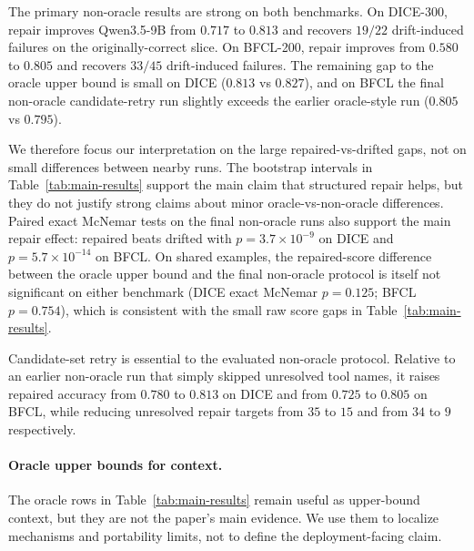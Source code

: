 \documentclass{llncs}
\begin{document}
The primary non-oracle results are strong on both benchmarks. On DICE-300, repair
improves Qwen3.5-9B from $0.717$ to $0.813$ and recovers $19/22$ drift-induced
failures on the originally-correct slice. On BFCL-200, repair improves from $0.580$
to $0.805$ and recovers $33/45$ drift-induced failures. The remaining gap to the
oracle upper bound is small on DICE ($0.813$ vs $0.827$), and on BFCL the final
non-oracle candidate-retry run slightly exceeds the earlier oracle-style run
($0.805$ vs $0.795$).

We therefore focus our interpretation on the large repaired-vs-drifted gaps, not on
small differences between nearby runs. The bootstrap intervals in
Table~\ref{tab:main-results} support the main claim that structured repair helps,
but they do not justify strong claims about minor oracle-vs-non-oracle differences.
Paired exact McNemar tests on the final non-oracle runs also support the main
repair effect: repaired beats drifted with $p=3.7\times 10^{-9}$ on DICE and
$p=5.7\times 10^{-14}$ on BFCL\@. On shared examples, the repaired-score difference
between the oracle upper bound and the final non-oracle protocol is itself not
significant on either benchmark (DICE exact McNemar $p=0.125$; BFCL
$p=0.754$), which is consistent with the small raw score gaps in
Table~\ref{tab:main-results}.

Candidate-set retry is essential to the evaluated non-oracle protocol. Relative to
an earlier non-oracle run that simply skipped unresolved tool names, it raises
repaired accuracy from $0.780$ to $0.813$ on DICE and from $0.725$ to $0.805$ on
BFCL, while reducing unresolved repair targets from $35$ to $15$ and from $34$ to
$9$ respectively.

\paragraph{Oracle upper bounds for context.}
The oracle rows in Table~\ref{tab:main-results} remain useful as upper-bound
context, but they are not the paper's main evidence. We use them to localize
mechanisms and portability limits, not to define the deployment-facing claim.
\end{document}
